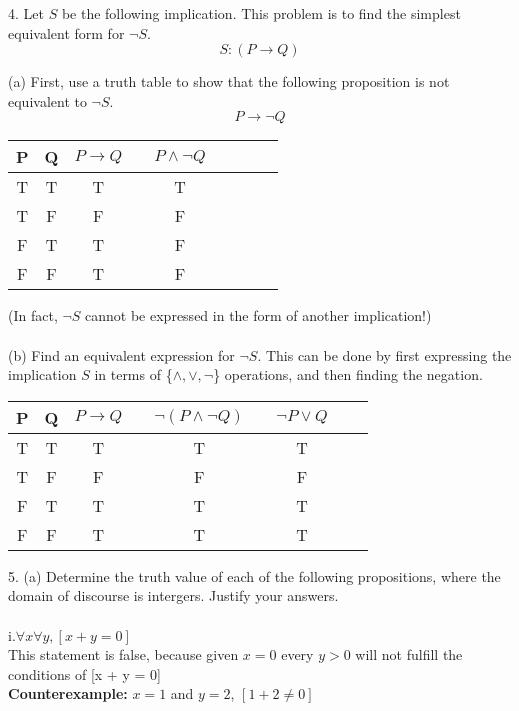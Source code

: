 \documentclass[10pt]{article}
\begin{document}
4. Let $S$ be the following implication.  This problem is to find the simplest equivalent form for $\neg S$.
$$S: (P \rightarrow Q)$$ 

(a) First, use a truth table to show that the following proposition is not equivalent to $\neg S$.
$$P \rightarrow \neg Q$$

\center
\begin{tabular}{@{ }c@{ }@{ }c | c@{ } | @{ }c@{ }@{ }c@{ }@{ }c@{ }@{ }c@{ }@{ }c@{ }@{ }c}
P & Q & $P \rightarrow Q$ & & $P \wedge \neg Q$ &  &  & \\
\hline 
T & T & T &  & T & \\
T & F & F &  & F & \\
F & T & T &  & F & \\
F & F & T &  & F & \\
\end{tabular}
\flushleft

(In fact, $\neg S$ cannot be expressed in the form of another implication!)\\~\\

(b) Find an equivalent expression for $\neg S$.  This can be done by first expressing the implication $S$ in terms of \{$\wedge,\vee,\neg$\} operations, and then finding the negation.\\

\center
\begin{tabular}{@{ }c@{ }@{ }c | c@{ }|@{ }c@{ }@{ }c |@{ }@{ }c@{ }@{ }c@{ }@{ }c@{ }@{ }c}
P & Q & $P \rightarrow Q$ & & $\neg(P \wedge \neg Q)$ &  & $\neg P \vee Q$ & \\
\hline 
T & T & T &  & T & & T\\
T & F & F &  & F & & F\\
F & T & T &  & T & & T\\
F & F & T &  & T & & T\\
\end{tabular}
\flushleft



5. (a) Determine the truth value of each of the following propositions, where the domain of discourse is intergers.  Justify your answers.\\~\\

i.$\forall x \forall y, [x + y = 0]$\\
This statement is false, because given $x = 0$ every $y > 0$ will not fulfill the conditions of [x + y = 0]\\
\textbf{Counterexample:} $x = 1$ and $y = 2$, $[1 + 2 \neq 0]$\\~\\
\end{document}
